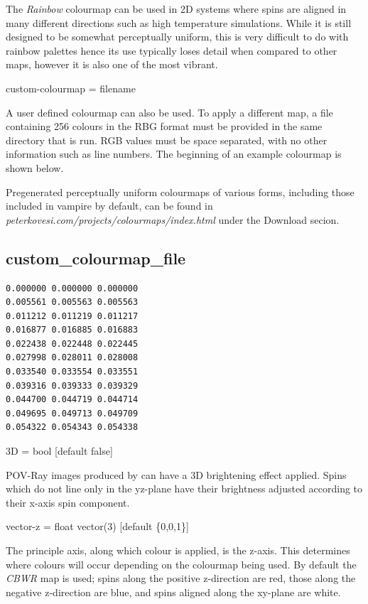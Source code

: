The \textit{Rainbow} colourmap can be used in 2D systems where spins are aligned
in many different directions such as high temperature simulations. While it is
still designed to be somewhat perceptually uniform, this is very difficult to do
with rainbow palettes hence its use typically loses detail when compared to
other maps, however it is also one of the most vibrant.

{\zicf custom-colourmap = filename }
 A user
defined colourmap can also be used. To apply a different map, a file containing
256 colours in the RBG format must be provided in the same directory that \vdc
is run. RGB values must be space separated, with no other information such as
line numbers. The beginning of an example colourmap is shown below.

Pregenerated perceptually uniform colourmaps of various forms, including those
included in vampire by default, can be found in
\textit{peterkovesi.com/projects/\newline colourmaps/index.html} under the
Download secion.

\subsection*{custom\_colourmap\_file}
{\footnotesize
\begin{verbatim}
0.000000 0.000000 0.000000
0.005561 0.005563 0.005563
0.011212 0.011219 0.011217
0.016877 0.016885 0.016883
0.022438 0.022448 0.022445
0.027998 0.028011 0.028008
0.033540 0.033554 0.033551
0.039316 0.039333 0.039329
0.044700 0.044719 0.044714
0.049695 0.049713 0.049709
0.054322 0.054343 0.054338
\end{verbatim}
}

{\zicf 3D = bool [default false]}
 POV-Ray images produced by
\vdc can have a 3D brightening effect applied. Spins which do not line only in
the yz-plane have their brightness adjusted according to their x-axis spin
component.

{\zicf vector-z = float vector(3) [default \{0,0,1\}]}
 The principle axis,
along which colour is applied, is the z-axis. This determines where colours will
occur depending on the colourmap being used. By default the \textit{CBWR} map is
used; spins along the positive z-direction are red, those along the negative
z-direction are blue, and spins aligned along the xy-plane are white.

